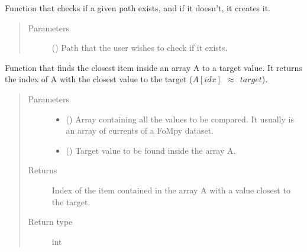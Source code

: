 \documentclass[letterpaper,10pt,english,openany, oneside]{sphinxmanual}
\begin{document}
\begin{fulllineitems}
\label{\detokenize{index:fompy.aux.checkPath}}
Function that checks if a given path exists, and if it doesn’t, it creates it.
\begin{quote}\begin{description}
\item[{Parameters}] \leavevmode
{} () \textendash{} Path that the user wishes to check if it exists.

\end{description}\end{quote}

\end{fulllineitems}


\begin{fulllineitems}
\label{\detokenize{index:fompy.aux.find_closest}}
Function that finds the closest item inside an array A to a target value.
It returns the index of A with the closest value to the target (\(A[idx]~~{\approx}~~target\)).
\begin{quote}\begin{description}
\item[{Parameters}] \leavevmode\begin{itemize}
\item {} 
 () \textendash{} Array containing all the values to be compared. It usually is
an array of currents of a FoMpy dataset.

\item {} 
 () \textendash{} Target value to be found inside the array A.

\end{itemize}

\item[{Returns}] \leavevmode
{} \textendash{} Index of the item contained in the array A with a value closest to the target.

\item[{Return type}] \leavevmode
int

\end{description}\end{quote}

\end{fulllineitems}
\end{document}
